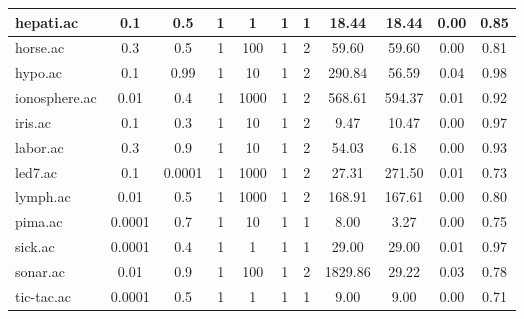 \begin{table}[htbp]
\begin{tabular}{|l|c|c|c|c|c|c||c|c|c|c|}
		\hline
		hepati.ac      & 0.1      & 0.5         & 1              & 1                   & 1             & 1             & 18.44          & 18.44          & 0.00           & 0.85           \\
		\hline
		horse.ac       & 0.3      & 0.5         & 1              & 100                 & 1             & 2             & 59.60          & 59.60          & 0.00           & 0.81           \\
		\hline
		hypo.ac        & 0.1      & 0.99        & 1              & 10                  & 1             & 2             & 290.84         & 56.59          & 0.04           & 0.98           \\
		\hline
		ionosphere.ac  & 0.01     & 0.4         & 1              & 1000                & 1             & 2             & 568.61         & 594.37         & 0.01           & 0.92           \\
		\hline
		iris.ac        & 0.1      & 0.3         & 1              & 10                  & 1             & 2             & 9.47           & 10.47          & 0.00           & 0.97           \\
		\hline
		labor.ac       & 0.3      & 0.9         & 1              & 10                  & 1             & 2             & 54.03          & 6.18           & 0.00           & 0.93           \\
		\hline
		led7.ac        & 0.1      & 0.0001      & 1              & 1000                & 1             & 2             & 27.31          & 271.50         & 0.01           & 0.73           \\
		\hline
		lymph.ac       & 0.01     & 0.5         & 1              & 1000                & 1             & 2             & 168.91         & 167.61         & 0.00           & 0.80           \\
		\hline
		pima.ac        & 0.0001   & 0.7         & 1              & 10                  & 1             & 1             & 8.00           & 3.27           & 0.00           & 0.75           \\
		\hline
		sick.ac        & 0.0001   & 0.4         & 1              & 1                   & 1             & 1             & 29.00          & 29.00          & 0.01           & 0.97           \\
		\hline
		sonar.ac       & 0.01     & 0.9         & 1              & 100                 & 1             & 2             & 1829.86        & 29.22          & 0.03           & 0.78           \\
		\hline
		tic-tac.ac     & 0.0001   & 0.5         & 1              & 1                   & 1             & 1             & 9.00           & 9.00           & 0.00           & 0.71           \\

\end{tabular}
\end{table}
